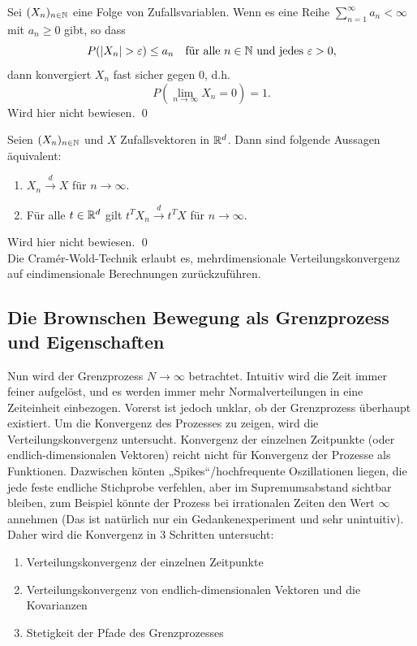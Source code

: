 \begin{lemma}
Sei $(X_n)_{n \in \Bbb N}$ eine Folge von Zufallsvariablen. Wenn es eine Reihe $\sum_{n=1}^\infty a_n \lt \infty$ mit $a_n \geq 0$ gibt, so dass
$$P(|X_n| > \varepsilon) \leq a_n \quad \text{für alle } n \in \Bbb N \text{ und jedes } \varepsilon > 0,$$
dann konvergiert $X_n$ fast sicher gegen $0$, d.h.
$$P\left(\lim_{n \to \infty} X_n = 0\right) = 1.$$
Wird hier nicht bewiesen. \qed
\end{lemma}

\begin{satz}
Seien $(X_n)_{n \in \Bbb N}$ und $X$ Zufallsvektoren in $\Bbb R^d$. Dann sind folgende Aussagen äquivalent:
\begin{enumerate}
    \item $X_n \xrightarrow{d} X$ für $n \to \infty$.
    \item Für alle $t \in \Bbb R^d$ gilt $t^T X_n \xrightarrow{d} t^T X$ für $n \to \infty$.
\end{enumerate}
Wird hier nicht bewiesen. \qed \\
Die Cramér-Wold-Technik erlaubt es, mehrdimensionale Verteilungskonvergenz auf eindimensionale Berechnungen zurückzuführen.
\end{satz}

\subsection{Die Brownschen Bewegung als Grenzprozess und Eigenschaften}
Nun wird der Grenzprozess $N \to \infty$ betrachtet. Intuitiv wird die Zeit immer feiner aufgelöst,
und es werden immer mehr Normalverteilungen in eine Zeiteinheit einbezogen. Vorerst ist jedoch unklar, 
ob der Grenzprozess überhaupt existiert. Um die Konvergenz des Prozesses zu zeigen, wird die Verteilungskonvergenz 
untersucht. Konvergenz der einzelnen Zeitpunkte (oder endlich-dimensionalen Vektoren) reicht nicht 
für Konvergenz der Prozesse als Funktionen. Dazwischen könten „Spikes“/hochfrequente Oszillationen liegen,
die jede feste endliche Stichprobe verfehlen, aber im Supremumsabstand sichtbar bleiben, zum Beispiel könnte der
Prozess bei irrationalen Zeiten den Wert $\infty$ annehmen (Das ist natürlich nur ein Gedankenexperiment und 
sehr unintuitiv). Daher wird die Konvergenz in 3 Schritten untersucht:
\begin{enumerate}
  \item Verteilungskonvergenz der einzelnen Zeitpunkte
  \item Verteilungskonvergenz von endlich-dimensionalen Vektoren und die Kovarianzen
  \item Stetigkeit der Pfade des Grenzprozesses
\end{enumerate}

